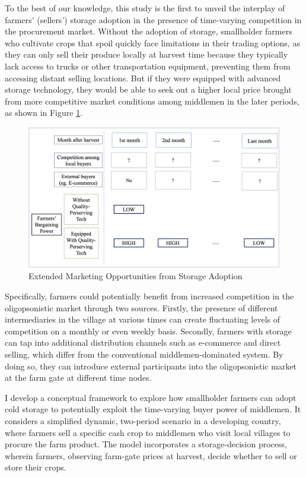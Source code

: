 To the best of our knowledge, this study is the first to unveil the interplay of farmers' (sellers') storage adoption in the presence of time-varying competition in the procurement market. Without the adoption of storage, smallholder farmers who cultivate crops that spoil quickly face limitations in their trading options, as they can only sell their produce locally at harvest time because they typically lack access to trucks or other transportation equipment, preventing them from accessing distant selling locations. But if they were equipped with advanced storage technology, they would be able to seek out a higher local price brought from more competitive market conditions among middlemen in the later periods, as shown in Figure \ref{Figure: Demo}.

\begin{figure}[ht]
\centering
\includegraphics[width=1\textwidth]{figures/graphic_demo.png}
\caption{Extended Marketing Opportunities from Storage Adoption}
\label{Figure: Demo}
\end{figure}

Specifically, farmers could potentially benefit from increased competition in the oligopsonistic market through two sources. Firstly, the presence of different intermediaries in the village at various times can create fluctuating levels of competition on a monthly or even weekly basis. Secondly, farmers with storage can tap into additional distribution channels such as e-commerce and direct selling, which differ from the conventional middlemen-dominated system. By doing so, they can introduce external participants into the oligopsonistic market at the farm gate at different time nodes. 

I develop a conceptual framework to explore how smallholder farmers can adopt cold storage to potentially exploit the time-varying buyer power of middlemen. It considers a simplified dynamic, two-period scenario in a developing country, where farmers sell a specific cash crop to middlemen who visit local villages to procure the farm product. The model incorporates a storage-decision process, wherein farmers, observing farm-gate prices at harvest, decide whether to sell or store their crops.

